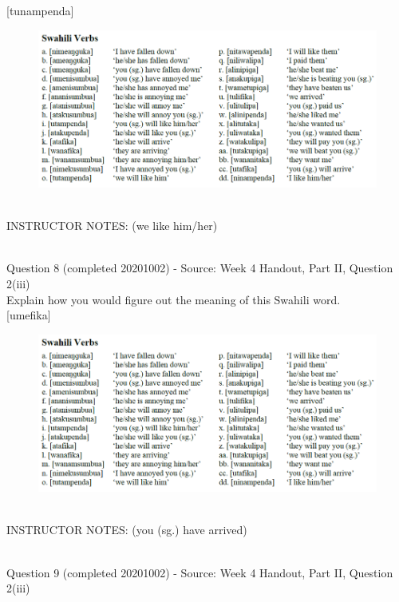 \documentclass[12pt]{article}
\begin{document}
{[tunampenda]}

\begin{figure}[H]
\includegraphics{../images/swahiliverbs.png}
\end{figure}

~\\
INSTRUCTOR NOTES: (we like him/her)


~\\

{\large Question 8} (completed 20201002) - Source: Week 4 Handout, Part II, Question 2(iii)\\

Explain how you would figure out the meaning of this Swahili word.\\

{[umefika]}

\begin{figure}[H]
\includegraphics{../images/swahiliverbs.png}
\end{figure}

~\\
INSTRUCTOR NOTES: (you (sg.) have arrived)


~\\

{\large Question 9} (completed 20201002) - Source: Week 4 Handout, Part II, Question 2(iii)\\
\end{document}

